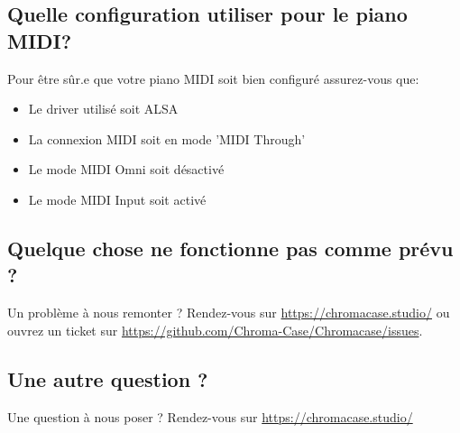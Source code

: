 \subsection{Quelle configuration utiliser pour le piano MIDI?}
Pour être sûr.e que votre piano MIDI soit bien configuré assurez-vous que:
\begin{itemize}
	\item Le driver utilisé soit ALSA
	\item La connexion MIDI soit en mode 'MIDI Through'
	\item Le mode MIDI Omni soit désactivé
	\item Le mode MIDI Input soit activé
\end{itemize}


\subsection{Quelque chose ne fonctionne pas comme prévu ?}
Un problème à nous remonter ? Rendez-vous sur \url{https://chromacase.studio/} ou ouvrez un ticket sur \url{https://github.com/Chroma-Case/Chromacase/issues}.


\subsection{Une autre question ?}
Une question à nous poser ? Rendez-vous sur \url{https://chromacase.studio/}
